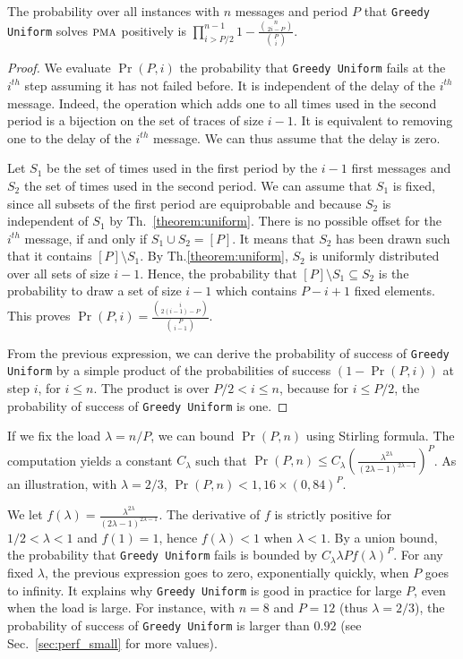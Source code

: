 \documentclass[a4paper,UKenglish,cleveref, autoref, thm-restate]{lipics-v2019}
\newcommand\pma{\textsc{pma}\xspace}
\newcommand\greedyuniform{\texttt{Greedy Uniform}\xspace}
\begin{document}
\begin{theorem}
The probability over all instances with $n$ messages and period $P$ that \greedyuniform solves $\pma$ positively is $\displaystyle{\prod_{i > P/2}^{n-1}1 - \frac{\binom{n}{2i-P}}{\binom{P}{i}}}$.
\end{theorem}
\begin{proof}
We evaluate $\Pr(P,i)$ the probability that \greedyuniform fails at the $i^{th}$ step assuming it has not failed before. It is independent of the delay of the $i^{th}$ message. Indeed, the operation which adds one to all times used in the second period is a bijection on the set of traces of size $i-1$. It is equivalent to removing one to the delay of the $i^{th}$ message. We can thus assume that the delay is zero.

Let $S_1$ be the set of times used in the first period by the $i-1$ first messages and $S_2$ the set of times used in the second period. We can assume that $S_1$ is fixed, since all subsets of the first period are equiprobable and because $S_2$ is independent of $S_1$ by Th.~\ref{theorem:uniform}. There is no possible offset for the $i^{th}$ message, if and only if $S_1 \cup S_2 = [P]$. It means that $S_2$ has been drawn such that it contains $[P] \setminus S_1$. By Th.\ref{theorem:uniform}, $S_2$ is uniformly distributed over all sets of size $i-1$. Hence, the probability that  $[P]  \setminus S_1 \subseteq S_2$  is the probability to draw a set of size $i-1$ which contains $P- i + 1$ fixed elements. This proves $\Pr(P,i) = \frac{\binom{i}{2(i-1)-P}}{\binom{P}{i-1}}$.

From the previous expression, we can derive the probability of success of \greedyuniform by a simple product of the probabilities of success $(1 - \Pr(P,i))$ at step $i$, for $i \leq n$. The product is over $ P/2 < i \leq n$, because for $i \leq P/2$, the probability of success of \greedyuniform is one. 
\end{proof}


If we fix the load $\lambda = n/P$, we can bound $\Pr(P,n)$ using Stirling formula. The computation yields a constant $C_{\lambda}$
such that $\Pr(P,n) \leq C_{\lambda} \left(\frac{\lambda^{2\lambda}}{(2\lambda -1)^{2\lambda -1}}\right)^P$.
As an illustration, with $\lambda = 2/3$, $\Pr(P,n) < 1,16 \times (0,84)^P$.

We let $f(\lambda) = \frac{\lambda^{2\lambda}}{(2\lambda -1)^{2\lambda -1}}$.
The derivative of $f$ is strictly positive for $1/2 < \lambda < 1$ and $f(1) = 1$, hence 
$f(\lambda) < 1$ when $\lambda < 1$. By a union bound, the probability that \greedyuniform fails is bounded by $C_{\lambda} \lambda P f(\lambda)^P$. For any fixed $\lambda$, the previous expression goes to zero, exponentially quickly, when $P$ goes to infinity. It explains why \greedyuniform is good in practice for large $P$, even when the load is large. 
For instance, with $n = 8$ and $P=12$ (thus $\lambda = 2/3$), the probability of success of \greedyuniform is larger than $0.92$ (see Sec.~\ref{sec:perf_small} for more values).
\end{document}
